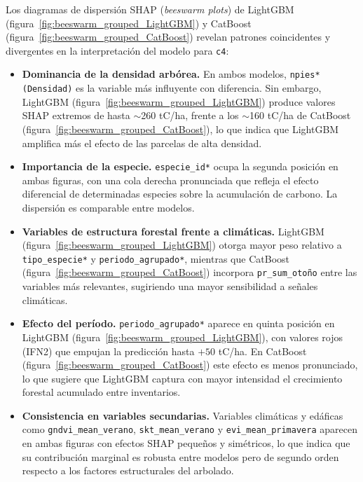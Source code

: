 Los diagramas de dispersión SHAP (\textit{beeswarm plots}) de LightGBM
(figura~\ref{fig:beeswarm_grouped_LightGBM}) y CatBoost
(figura~\ref{fig:beeswarm_grouped_CatBoost}) revelan patrones
coincidentes y divergentes en la interpretación del modelo para
\texttt{c4}:

\begin{itemize}

\item \textbf{Dominancia de la densidad arbórea.}
En ambos modelos, \texttt{npies* (Densidad)} es la variable más
influyente con diferencia. Sin embargo, LightGBM
(figura~\ref{fig:beeswarm_grouped_LightGBM}) produce valores SHAP
extremos de hasta $\sim$260 tC/ha, frente a los $\sim$160 tC/ha de
CatBoost (figura~\ref{fig:beeswarm_grouped_CatBoost}), lo que indica
que LightGBM amplifica más el efecto de las parcelas de alta densidad.

\item \textbf{Importancia de la especie.}
\texttt{especie\_id*} ocupa la segunda posición en ambas figuras,
con una cola derecha pronunciada que refleja el efecto diferencial
de determinadas especies sobre la acumulación de carbono. La
dispersión es comparable entre modelos.

\item \textbf{Variables de estructura forestal frente a climáticas.}
LightGBM (figura~\ref{fig:beeswarm_grouped_LightGBM}) otorga mayor
peso relativo a \texttt{tipo\_especie*} y \texttt{periodo\_agrupado*},
mientras que CatBoost (figura~\ref{fig:beeswarm_grouped_CatBoost})
incorpora \texttt{pr\_sum\_otoño} entre las variables más relevantes,
sugiriendo una mayor sensibilidad a señales climáticas.

\item \textbf{Efecto del período.}
\texttt{periodo\_agrupado*} aparece en quinta posición en
LightGBM (figura~\ref{fig:beeswarm_grouped_LightGBM}), con valores
rojos (IFN2) que empujan la predicción hasta $+50$ tC/ha. En CatBoost
(figura~\ref{fig:beeswarm_grouped_CatBoost}) este efecto es menos
pronunciado, lo que sugiere que LightGBM captura con mayor intensidad
el crecimiento forestal acumulado entre inventarios.

\item \textbf{Consistencia en variables secundarias.}
Variables climáticas y edáficas como \texttt{gndvi\_mean\_verano},
\texttt{skt\_mean\_verano} y \texttt{evi\_mean\_primavera} aparecen
en ambas figuras con efectos SHAP pequeños y simétricos, lo que
indica que su contribución marginal es robusta entre modelos pero
de segundo orden respecto a los factores estructurales del arbolado.

\end{itemize}


